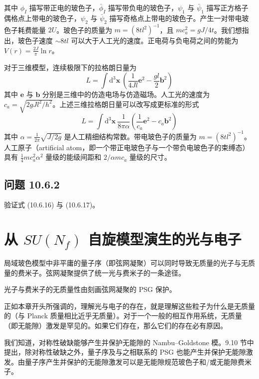 其中 $\phi_I$ 描写带正电的玻色子，$\bar{\phi}_I$ 描写带负电的玻色子，$\psi_1$ 与 $\bar{\psi}_1$ 描写正方格子偶格点上带电的玻色子，$\psi_2$ 与 $\bar{\psi}_2$ 描写奇格点上带电的玻色子。产生一对带电玻色子耗费能量 $2U$。玻色子的质量为 $m=(8tl^{2})^{-1}$，且 $mc_a^{2}=gJ/4t$。我们想指出，玻色子速度 $\sim 8tl$ 可以大于人工光的速度。正电荷与负电荷之间的势能为 $V(r)=\frac{2J}{\pi}\ln r$。

对于三维模型，连续极限下的拉格朗日量为
\begin{equation*}
L=\int\mathrm{d}^{3}\pmb x\ \left(\frac{1}{4Jl}\pmb e^{2}-\frac{gl}{2}\pmb b^{2}\right)\tag{10.6.17}
\end{equation*}
其中 $\pmb e$ 与 $\pmb b$ 分别是三维中的仿造电场与仿造磁场。人工光的速度为 $c_a=\sqrt{2gJl^{2}/h^{2}}$。上述三维拉格朗日量可以改写成更标准的形式
\begin{equation*}
L=\int\mathrm{d}^{3}\pmb x\ \frac{1}{8\pi\alpha}\left(\frac{1}{c_a}\pmb e^{2}-c_a\pmb b^{2}\right)\tag{10.6.18}
\end{equation*}
其中 $\alpha=\frac{1}{2\pi}\sqrt{J/2g}$ 是人工精细结构常数。带电玻色子的质量为 $m=(8tl^{2})^{-1}$。人工原子（artificial atom，即一个带正电玻色子与一个带负电玻色子的束缚态）具有 $\frac{1}{4}mc_a^{2}\alpha^{2}$ 量级的能级间距和 $2/\alpha mc_a$ 量级的尺寸。

\subsection*{问题 10.6.2}

验证式 (10.6.16) 与 (10.6.17)。

\section{从 $SU(N_f)$ 自旋模型演生的光与电子}

\begin{keypoints}
\item 局域玻色模型中非平庸的量子序（即弦网凝聚）可以同时导致无质量的光子与无质量的费米子。弦网凝聚提供了统一光与费米子的一条途径。
\item 光子与费米子的无质量性由刻画弦网凝聚的 PSG 保护。
\end{keypoints}

正如本章开头所强调的，理解光与电子的存在，就是理解这些粒子为什么是无质量的（与 Planck 质量相比近乎无质量）。对于一个一般的相互作用系统，无质量（即无能隙）激发是罕见的。如果它们存在，那么它们的存在必有原因。

我们知道，对称性破缺能够产生并保护无能隙的 Nambu--Goldstone 模。9.10 节中提出，除对称性破缺之外，量子序及与之相联系的 PSG 也能产生并保护无能隙激发。由量子序产生并保护的无能隙激发可以是无能隙规范玻色子和/或无能隙费米子。

